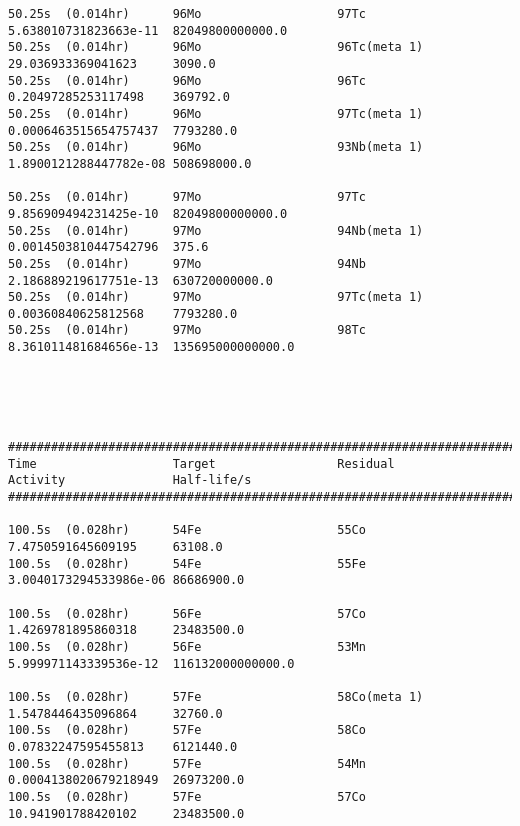 \begin{lstlisting}[style=sOutputFile,caption={Final results for steel irradiation},label={listing:alexsteel}]
50.25s  (0.014hr)      96Mo                   97Tc                   5.638010731823663e-11  82049800000000.0      
50.25s  (0.014hr)      96Mo                   96Tc(meta 1)           29.036933369041623     3090.0                
50.25s  (0.014hr)      96Mo                   96Tc                   0.20497285253117498    369792.0              
50.25s  (0.014hr)      96Mo                   97Tc(meta 1)           0.0006463515654757437  7793280.0             
50.25s  (0.014hr)      96Mo                   93Nb(meta 1)           1.8900121288447782e-08 508698000.0           

50.25s  (0.014hr)      97Mo                   97Tc                   9.856909494231425e-10  82049800000000.0      
50.25s  (0.014hr)      97Mo                   94Nb(meta 1)           0.0014503810447542796  375.6                 
50.25s  (0.014hr)      97Mo                   94Nb                   2.186889219617751e-13  630720000000.0        
50.25s  (0.014hr)      97Mo                   97Tc(meta 1)           0.00360840625812568    7793280.0             
50.25s  (0.014hr)      97Mo                   98Tc                   8.361011481684656e-13  135695000000000.0     





####################################################################################################################
Time                   Target                 Residual               Activity               Half-life/s            
####################################################################################################################

100.5s  (0.028hr)      54Fe                   55Co                   7.4750591645609195     63108.0               
100.5s  (0.028hr)      54Fe                   55Fe                   3.0040173294533986e-06 86686900.0            

100.5s  (0.028hr)      56Fe                   57Co                   1.4269781895860318     23483500.0            
100.5s  (0.028hr)      56Fe                   53Mn                   5.999971143339536e-12  116132000000000.0     

100.5s  (0.028hr)      57Fe                   58Co(meta 1)           1.5478446435096864     32760.0               
100.5s  (0.028hr)      57Fe                   58Co                   0.07832247595455813    6121440.0             
100.5s  (0.028hr)      57Fe                   54Mn                   0.0004138020679218949  26973200.0            
100.5s  (0.028hr)      57Fe                   57Co                   10.941901788420102     23483500.0            


\end{lstlisting}
